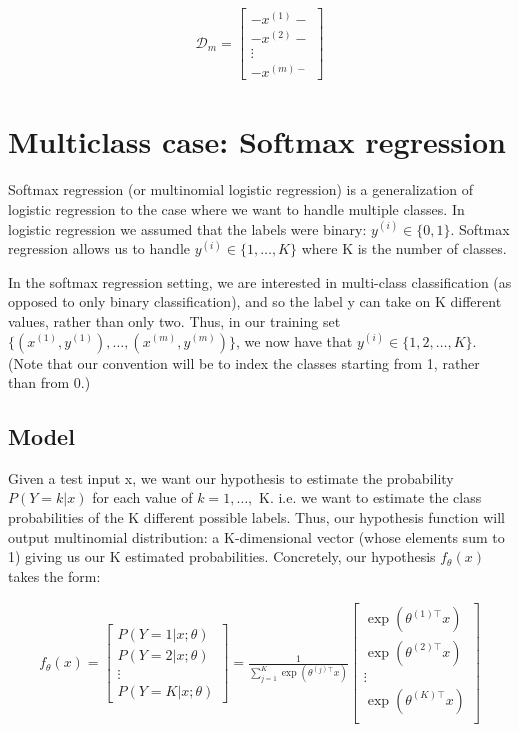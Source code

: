 \begin{align}
	\mathcal{D}_m = 
	\left[
		\begin{array}{cccc}
			- x^{(1)} - \\
			- x^{(2)} -  \\ 
			\vdots \\
			- x^{(m) - } 
		\end{array}
	\right]
\end{align}








\section{Multiclass case: Softmax regression}


Softmax regression (or multinomial logistic regression) is a generalization of logistic regression to the case where we want to handle multiple classes. In logistic regression we assumed that the labels were binary: $y^{(i)} \in \{0,1\}$. Softmax regression allows us to handle $ y^{(i)} \in \{1,\ldots,K\}$ where K is the number of classes.

In the softmax regression setting, we are interested in multi-class classification (as opposed to only binary classification), and so the label y can take on K different values, rather than only two. Thus, in our training set $\{ (x^{(1)}, y^{(1)}), \ldots, (x^{(m)}, y^{(m)}) \}$, we now have that $y^{(i)} \in \{1, 2, \ldots, K\}$. (Note that our convention will be to index the classes starting from 1, rather than from 0.) 

\subsection{Model}

Given a test input x, we want our hypothesis to estimate the probability $P(Y=k | x)$ for each value of $k = 1, \ldots,$ K. i.e. we want to estimate the class probabilities of the K different possible labels. Thus, our hypothesis function will output multinomial distribution: a K-dimensional vector (whose elements sum to 1) giving us our K estimated probabilities. Concretely, our hypothesis $f_{\theta}(x)$ takes the form:

\begin{align}
	f_\theta(x)
	=
	\begin{bmatrix}
		P(Y = 1 | x; \theta) \\ P(Y = 2 | x; \theta) \\ \vdots \\ P(Y = K | x; \theta) 
	\end{bmatrix} 
	= 
	\frac{1}{ \sum_{j=1}^{K}{\exp(\theta^{(j)\top} x) }} 
	\begin{bmatrix} 
		\exp(\theta^{(1)\top} x ) \\ \exp(\theta^{(2)\top} x ) \\ \vdots \\ \exp(\theta^{(K)\top} x ) \\ 
	\end{bmatrix} 
\end{align}

